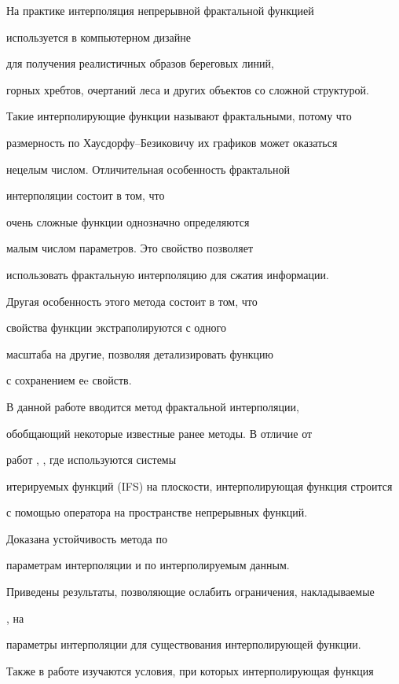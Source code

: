 На практике интерполяция непрерывной фрактальной функцией


используется в компьютерном дизайне


для получения реалистичных образов береговых линий,


горных хребтов, очертаний леса и других объектов со сложной структурой.





Такие интерполирующие функции называют фрактальными, потому что


размерность по Хаусдорфу--Безиковичу их графиков может оказаться


нецелым числом. Отличительная особенность фрактальной


интерполяции состоит в том, что


очень сложные функции однозначно определяются


малым числом параметров. Это свойство позволяет


использовать фрактальную интерполяцию для сжатия информации.


Другая особенность этого метода состоит в том, что


свойства функции экстраполируются с одного


масштаба на другие, позволяя детализировать функцию


с сохранением еe свойств.





В данной работе вводится метод фрактальной интерполяции,


обобщающий некоторые известные ранее методы. В отличие от


работ \cite{barnsley1}, \cite{recbar}, где используются системы


итерируемых функций (IFS) на плоскости, интерполирующая функция строится


с помощью оператора на пространстве непрерывных функций.


Доказана устойчивость метода по


параметрам интерполяции и по интерполируемым данным.


Приведены результаты, позволяющие ослабить ограничения, накладываемые


\cite{barnsley1}, \cite{recbar} на


параметры интерполяции для существования интерполирующей функции.


Также в работе изучаются условия, при которых интерполирующая функция



